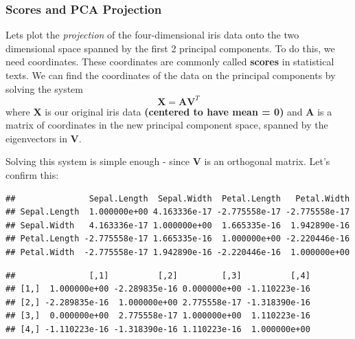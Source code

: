 \documentclass[
]{article}
\newenvironment{Shaded}{\begin{snugshade}}{\end{snugshade}}
\newcommand{\FunctionTok}[1]{\textcolor[rgb]{0.00,0.00,0.00}{#1}}
\newcommand{\NormalTok}[1]{#1}
\newcommand{\SpecialCharTok}[1]{\textcolor[rgb]{0.00,0.00,0.00}{#1}}
\theoremstyle{definition}
\theoremstyle{definition}
\theoremstyle{definition}
\theoremstyle{definition}
\theoremstyle{remark}
\begin{document}
\hypertarget{scores-and-pca-projection}{%
\subsubsection{Scores and PCA Projection}\label{scores-and-pca-projection}}

Lets plot the \emph{projection} of the four-dimensional iris data onto the two dimensional space spanned by the first 2 principal components. To do this, we need coordinates. These coordinates are commonly called \textbf{scores} in statistical texts. We can find the coordinates of the data on the principal components by solving the system
\[\mathbf{X}=\mathbf{A}\mathbf{V}^T\]
where \(\mathbf{X}\) is our original iris data \textbf{(centered to have mean = 0)} and \(\mathbf{A}\) is a matrix of coordinates in the new principal component space, spanned by the eigenvectors in \(\mathbf{V}\).

Solving this system is simple enough - since \(\mathbf{V}\) is an orthogonal matrix. Let's confirm this:

\begin{Shaded}
\end{Shaded}

\begin{verbatim}
##               Sepal.Length  Sepal.Width  Petal.Length   Petal.Width
## Sepal.Length  1.000000e+00 4.163336e-17 -2.775558e-17 -2.775558e-17
## Sepal.Width   4.163336e-17 1.000000e+00  1.665335e-16  1.942890e-16
## Petal.Length -2.775558e-17 1.665335e-16  1.000000e+00 -2.220446e-16
## Petal.Width  -2.775558e-17 1.942890e-16 -2.220446e-16  1.000000e+00
\end{verbatim}

\begin{Shaded}
\end{Shaded}

\begin{verbatim}
##               [,1]          [,2]         [,3]          [,4]
## [1,]  1.000000e+00 -2.289835e-16 0.000000e+00 -1.110223e-16
## [2,] -2.289835e-16  1.000000e+00 2.775558e-17 -1.318390e-16
## [3,]  0.000000e+00  2.775558e-17 1.000000e+00  1.110223e-16
## [4,] -1.110223e-16 -1.318390e-16 1.110223e-16  1.000000e+00
\end{verbatim}
\end{document}
